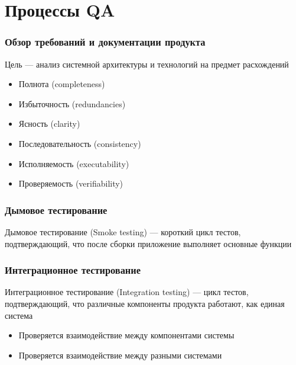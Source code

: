 \documentclass{../industrial-development}
\begin{document}
	\section{Процессы QA}
	\begin{frame} \frametitle{Обзор требований и документации продукта}
		\begin{block}{}
			\alert{Цель} --- анализ системной архитектуры и технологий на предмет расхождений
		\end{block}
		\begin{itemize}
			\item Полнота (completeness)
			\item Избыточность (redundancies)
			\item Ясность (clarity)
			\item Последовательность (consistency)
			\item Исполняемость (executability)
			\item Проверяемость (verifiability)
		\end{itemize}
	\end{frame}
	
	\begin{frame} \frametitle{Дымовое тестирование}
		\begin{block}{}
			\alert{Дымовое тестирование (Smoke testing)} --- короткий цикл тестов, подтверждающий, что после сборки приложение выполняет основные функции
		\end{block}
	\end{frame}
	
	\begin{frame} \frametitle{Интеграционное тестирование}
		\begin{block}{}
			\alert{Интеграционное тестирование (Integration testing)} --- цикл тестов, подтверждающий, что различные компоненты продукта работают, как единая система
		\end{block}
		\begin{itemize}
			\item Проверяется взаимодействие между компонентами системы
			\item Проверяется взаимодействие между разными системами
		\end{itemize}
	\end{frame}
	
\end{document}
